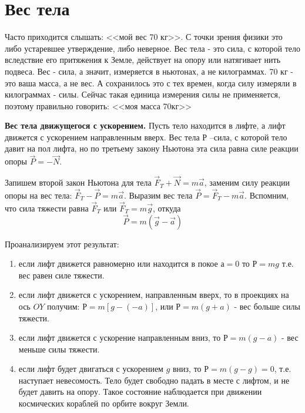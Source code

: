 \documentclass[a6paper, 11pt]{diss_4}
\renewcommand{\'}{\,'}
\begin{document}
\section{Вес тела}

  Часто приходится слышать: <<мой вес 70 кг>>. С точки зрения физики это либо
 устаревшее утверждение, либо неверное. Вес тела - это сила, с которой тело
вследствие его притяжения к Земле, действует на опору или натягивает нить
подвеса. Вес - сила, а значит, измеряется в ньютонах, а не килограммах. 70 кг -
это ваша масса, а не вес. А сохранилось это с тех времен, когда силу измеряли в
килограммах - силы. Сейчас такая единица измерения силы не применяется, поэтому
правильно говорить: <<моя масса 70кг>>

  \textbf{Вес тела движущегося с ускорением.} Пусть тело находится в лифте, а
лифт движется с ускорением направленным вверх. Вес тела $Р$ --сила, с которой
тело давит на пол лифта, но по третьему закону Ньютона эта сила равна силе
реакции опоры $\vec{P}=-\vec{N}$.

  Запишем второй закон Ньютона для тела $\vec{F}_T+\vec{N}=m\vec{a}$, заменим
силу реакции опоры на вес тела: $\vec{F}_T-\vec{P}=m\vec{a}$. Выразим вес тела
 $\vec{P}=\vec{F}_T-m\vec{a}$. Вспомним, что сила тяжести равна $\vec{F}_T$ или
$\vec{F}_T=m\vec{g}$, откуда
\[
\vec{P}=m(\vec{g}-\vec{a})
\]

Проанализируем этот результат:

\begin{enumerate}

  \item если лифт движется равномерно или находится в покое $а=0$ то $Р=mg$
т.е. вес равен силе тяжести.

  \item если лифт движется с ускорением, направленным вверх, то в проекциях на
 ось $OY$ получим: $Р = m\left[g-(-a)\right]$, или $Р=m(g+a)$ - вес больше силы
тяжести.

  \item если лифт движется с ускорение направленным вниз, то $Р = m(g-a)$ -
вес меньше силы тяжести.

  \item если лифт будет двигаться с ускорением $g$ вниз, то $Р = m(g-g)=0$,
т.е. наступает невесомость. Тело будет свободно падать в месте с лифтом, и не
будет давить на опору. Такое состояние наблюдается при движении космических
кораблей по орбите вокруг Земли.

\end{enumerate}
\end{document}
